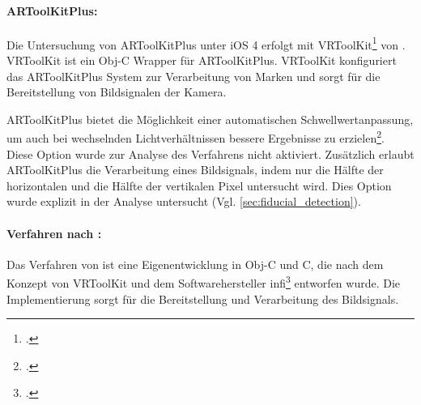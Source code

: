 \paragraph{ARToolKitPlus:} %
\label{par:artoolkitplus}
Die Untersuchung von ARToolKitPlus unter iOS 4 erfolgt mit VRToolKit\footcite[Vgl.][]{vrtoolkit} von
 \citeauthor{vrtoolkit}. VRToolKit ist ein Obj-C Wrapper für ARToolKitPlus. VRToolKit konfiguriert das ARToolKitPlus
 System zur Verarbeitung von Marken und sorgt für die Bereitstellung von Bildsignalen der Kamera.

ARToolKitPlus bietet die Möglichkeit einer automatischen Schwellwertanpassung, um auch bei wechselnden
 Lichtverhältnissen bessere Ergebnisse zu erzielen\footcite[Vgl.][S.~142]{wagner07b}. Diese Option wurde zur Analyse
 des Verfahrens nicht aktiviert. Zusätzlich erlaubt ARToolKitPlus die Verarbeitung eines Bildsignals, indem nur die
 Hälfte der horizontalen und die Hälfte der vertikalen Pixel untersucht wird. Dies Option wurde explizit in der
 Analyse untersucht (Vgl. \autoref{sec:fiducial_detection}).

\paragraph{Verfahren nach \citeauthor{hirzer08}:} %
\label{par:verfahren_nach_hirzer}
Das Verfahren von \citeauthor{hirzer08} ist eine Eigenentwicklung in Obj-C und C, die nach dem Konzept von VRToolKit und
 dem Softwarehersteller infi\footcite[Vgl.][]{infi} entworfen wurde. Die Implementierung sorgt für die Bereitstellung
 und Verarbeitung des Bildsignals.

